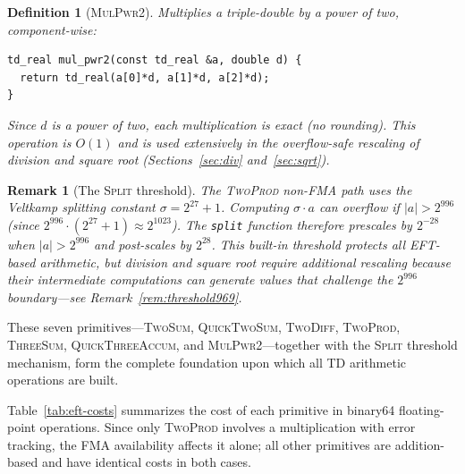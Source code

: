\documentclass[11pt,a4paper]{article}
\newtheorem{definition}{Definition}
\newtheorem{remark}{Remark}
\begin{document}
\begin{definition}[\textsc{MulPwr2}]
Multiplies a triple-double by a power of two, component-wise:
\begin{lstlisting}
td_real mul_pwr2(const td_real &a, double d) {
  return td_real(a[0]*d, a[1]*d, a[2]*d);
}
\end{lstlisting}
Since $d$ is a power of two, each multiplication is exact (no
rounding).  This operation is $O(1)$ and is used extensively in
the overflow-safe rescaling of division and square root
(Sections~\ref{sec:div} and~\ref{sec:sqrt}).
\end{definition}

\begin{remark}[The \textsc{Split} threshold]
\label{rem:split}
The \textsc{TwoProd} non-FMA path uses the Veltkamp splitting
constant $\sigma = 2^{27} + 1$.  Computing $\sigma \cdot a$ can
overflow if $|a| > 2^{996}$ (since
$2^{996} \cdot (2^{27} + 1) \approx 2^{1023}$).  The
\texttt{split} function therefore prescales by $2^{-28}$ when
$|a| > 2^{996}$ and post-scales by $2^{28}$.  This built-in
threshold protects \emph{all} EFT-based arithmetic, but division
and square root require additional rescaling because their
intermediate computations can generate values that challenge the
$2^{996}$ boundary---see Remark~\ref{rem:threshold969}.
\end{remark}

These seven primitives---\textsc{TwoSum}, \textsc{QuickTwoSum},
\textsc{TwoDiff}, \textsc{TwoProd}, \textsc{ThreeSum},
\textsc{QuickThreeAccum}, and \textsc{MulPwr2}---together with
the \textsc{Split} threshold mechanism, form the complete
foundation upon which all TD arithmetic operations are built.

Table~\ref{tab:eft-costs} summarizes the cost of each primitive
in binary64 floating-point operations.  Since only \textsc{TwoProd}
involves a multiplication with error tracking, the FMA
availability affects it alone; all other primitives are
addition-based and have identical costs in both cases.
\end{document}
